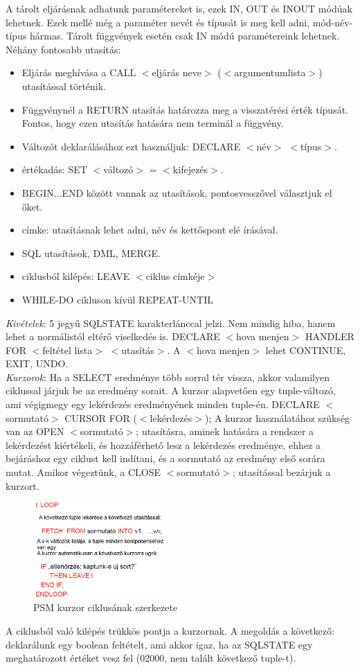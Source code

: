 \documentclass[margin=0px]{article}
\begin{document}
 	A tárolt eljárásnak adhatunk paramétereket is, ezek IN, OUT és INOUT módúak lehetnek. Ezek mellé még a paraméter nevét és típusát is meg kell adni, mód-név-típus hármas. Tárolt függvények esetén csak IN módú paramétereink lehetnek. \\
 	Néhány fontosabb utasítás:
 	\begin{itemize}
 		\item Eljárás meghívása a CALL $<$eljárás neve$>$ ($<$argumentumlista$>$) utasítással történik.
 		\item Függvénynél a RETURN utasítás határozza meg a visszatérési érték típusát. Fontos, hogy ezen utasítás hatására nem terminál a függvény.
 		\item Változót deklarálásához ezt használjuk: DECLARE $<$név$>$ $<$típus$>$.
 		\item értékadás: SET $<$változó$>$ = $<$kifejezés$>$.
 		\item BEGIN...END között vannak az utasítások, pontosvesszővel választjuk el őket.
 		\item címke: utasításnak lehet adni, név és kettőspont elé írásával.
 		\item SQL utasítások, DML, MERGE.
 		\item ciklusból kilépés: LEAVE $<$ciklus címkéje$>$
 		\item WHILE-DO cikluson kívül REPEAT-UNTIL
 	\end{itemize}
 	\textit{Kivételek}: 5 jegyű SQLSTATE karakterlánccal jelzi. Nem mindig hiba, hanem lehet a normálistól eltérő viselkedés is. DECLARE $<$hova menjen$>$ HANDLER FOR $<$feltétel lista$>$ $<$utasítás$>$. A $<$hova menjen$>$ lehet CONTINUE, EXIT, UNDO. \\
 	\textit{Kurzorok}: Ha a SELECT eredménye több sorral tér vissza, akkor valamilyen ciklussal járjuk be az eredmény sorait. A kurzor alapvetően egy tuple-változó, ami végigmegy egy lekérdezés eredményének minden tuple-én. DECLARE $<$sormutató$>$ CURSOR FOR ($<$lekérdezés$>$); A kurzor használatához szükség van az OPEN $<$sormutató$>$; utasításra, aminek hatására a rendszer a lekérdezést kiértékeli, és hozzáférhető lesz a lekérdezés eredménye, ehhez a bejáráshoz egy ciklust kell indítani, és a sormutató az eredmény első sorára mutat. Amikor végeztünk, a CLOSE $<$sormutató$>$; utasítással bezárjuk a kurzort.
 	\begin{figure}[H]
 		\centering
 		\includegraphics[width=0.45\textwidth]{img/psm3.png}
 		\caption{PSM kurzor ciklusának szerkezete}
 	\end{figure}
 	A ciklusból való kilépés trükkös pontja a kurzornak. A megoldás a következő: deklarálunk egy boolean feltételt, ami akkor igaz, ha az SQLSTATE egy meghatározott értéket vesz fel (02000, nem talált következő tuple-t).  
 	
\end{document}
